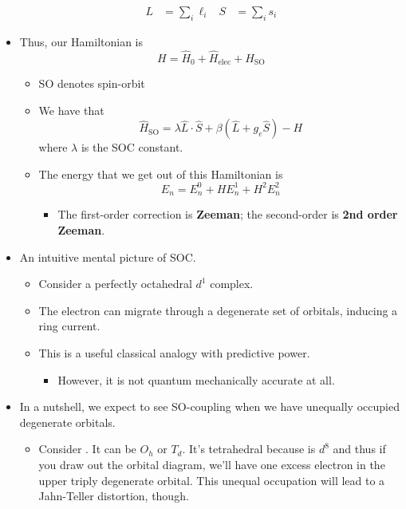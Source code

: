 \documentclass[../notes.tex]{subfiles}
\begin{document}
\begin{itemize}
    \begin{align*}
        L &= \sum_i\ell_i&
        S &= \sum_is_i
    \end{align*}
    \item Thus, our Hamiltonian is
    \begin{equation*}
        H = \hat{H}_0+\hat{H}_\text{elec}+\hat{H}_\text{SO}
    \end{equation*}
    \begin{itemize}
        \item SO denotes spin-orbit
        \item We have that
        \begin{equation*}
            \hat{H}_\text{SO} = \lambda\hat{L}\cdot\hat{S}+\beta(\hat{L}+g_e\hat{S})-H
        \end{equation*}
        where $\lambda$ is the SOC constant.
        \item The energy that we get out of this Hamiltonian is
        \begin{equation*}
            E_n = E_n^0+HE_n^1+H^2E_n^2
        \end{equation*}
        \begin{itemize}
            \item The first-order correction is \textbf{Zeeman}; the second-order is \textbf{2nd order Zeeman}.
        \end{itemize}
    \end{itemize}
    \item An intuitive mental picture of SOC.
    \begin{itemize}
        \item Consider a perfectly octahedral $d^1$ complex.
        \item The electron can migrate through a degenerate set of orbitals, inducing a ring current.
        \item This is a useful classical analogy with predictive power.
        \begin{itemize}
            \item However, it is not quantum mechanically accurate at all.
        \end{itemize}
    \end{itemize}
    \item In a nutshell, we expect to see SO-coupling when we have unequally occupied degenerate orbitals.
    \begin{itemize}
        \item Consider . It can be $O_h$ or $T_d$. It's tetrahedral because  is $d^8$ and thus if you draw out the orbital diagram, we'll have one excess electron in the upper triply degenerate orbital. This unequal occupation will lead to a Jahn-Teller distortion, though.

\end{itemize}
\end{itemize}
\end{document}
